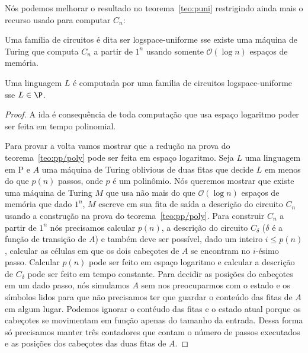Nós podemos melhorar o resultado no teorema~\ref{teo:puni} restrigindo ainda mais o recurso usado para computar $C_{n}$:

\begin{defi} 

Uma família de circuitos é dita ser logspace-uniforme sse existe uma máquina de Turing que computa $C_{n}$ a partir de $1^{n}$ usando somente $\mathcal{O}(\log n)$ espaços de memória.

\end{defi}

\begin{teo}

Uma linguagem $L$ é computada por uma família de circuitos logspace-uniforme sse $L \in \P$.

\end{teo}

\begin{proof}

\hfill

A ida é consequência de toda computação que usa espaço logaritmo poder ser feita em tempo polinomial.

Para provar a volta vamos mostrar que a redução na prova do teorema~\ref{teo:pp/poly} pode ser feita em espaço logaritmo. Seja $L$ uma linguagem em P e $A$ uma máquina de Turing oblivious de duas fitas que decide $L$ em menos do que $p(n)$ passos, onde $p$ é um polinômio. Nós queremos mostrar que existe uma máquina de Turing $M$ que usa não mais do que $\mathcal{O}(\log n)$ espaços de memória que dado $1^{n}$, $M$ escreve em sua fita de saída a descrição do circuito $C_{n}$ usando a construção na prova do teorema~\ref{teo:pp/poly}. Para construir $C_{n}$ a partir de $1^{n}$ nós precisamos calcular $p(n)$, a descrição do circuito $C_{\delta}$ ($\delta$ é a função de transição de $A$) e também deve ser possível, dado um inteiro $i \leq p(n)$, calcular as células em que os dois cabeçotes de $A$ se encontram no $i$-ésimo passo. Calcular $p(n)$ pode ser feito em espaço logaritmo e calcular a descrição de $C_{\delta}$ pode ser feito em tempo constante. Para decidir as posições do cabeçotes em um dado passo, nós simulamos $A$ sem nos preocuparmos com o estado e os símbolos lidos para que não precisamos ter que guardar o conteúdo das fitas de $A$ em algum lugar. Podemos ignorar o contéudo das fitas e o estado atual porque os cabeçotes se movimentam em função apenas do tamanho da entrada. Dessa forma só precisamos manter três contadores que contam o número de passos executados e as posições dos cabeçotes das duas fitas de $A$.

\end{proof}

